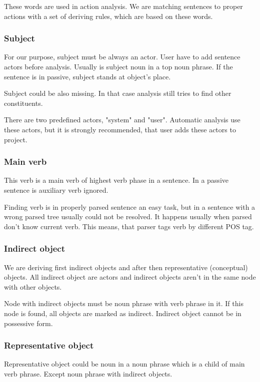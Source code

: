 These words are used in action analysis. We are matching sentences to proper actions with a set of deriving rules, which are based on these words. 
                                                                    
\subsubsection{Subject}
For our purpose, subject must be always an actor. User have to add sentence actors before analysis. Usually is subject noun in a top noun phrase. If the sentence is in passive, subject stands at object's place. 

Subject could be also missing. In that case analysis still tries to find other constituents.

There are two predefined actors, "system" and "user". Automatic analysis use these actors, but it is strongly recommended, that user adds these actors to project.

\subsubsection{Main verb}
This verb is a main verb of highest verb phase in a sentence. In a passive sentence is auxiliary verb ignored. 

Finding verb is in properly parsed sentence an easy task, but in a sentence with a wrong parsed tree usually could not be resolved. It happens usually when parsed don't know current verb. This means, that parser tags verb by different POS tag.

\subsubsection{Indirect object}
We are deriving first indirect objects and after then representative (conceptual) objects. All indirect object are actors and indirect objects aren't in the same node with other objects.

Node with indirect objects must be noun phrase with verb phrase in it. If this node is found, all objects are marked as indirect. Indirect object cannot be in possessive form.  

\subsubsection{Representative object}
Representative object could be noun in a noun phrase which is a child of main verb phrase. Except noun phrase with indirect objects.

